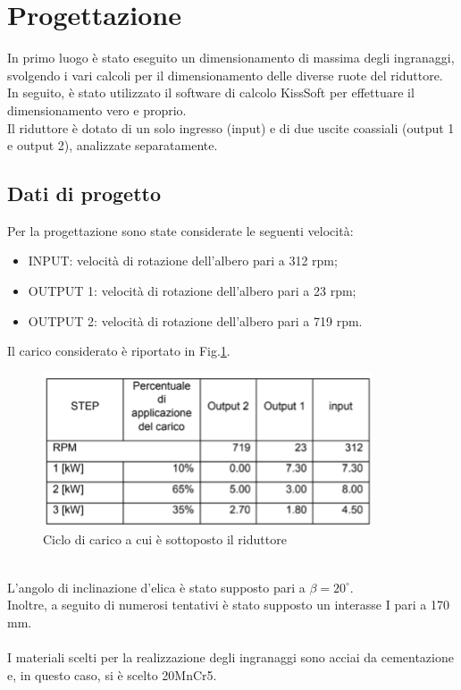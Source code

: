 \section{Progettazione}
In primo luogo è stato eseguito un dimensionamento di massima degli ingranaggi, svolgendo i vari calcoli per il dimensionamento delle diverse ruote del riduttore. In seguito, è stato utilizzato il software di calcolo KissSoft per effettuare il dimensionamento vero e proprio. \\
Il riduttore è dotato di un solo ingresso (input) e di due uscite coassiali (output 1 e output 2), analizzate separatamente. 
\subsection{Dati di progetto}
Per la progettazione sono state considerate le seguenti velocità:
\begin{itemize}
    \item INPUT: velocità di rotazione dell'albero pari a 312 rpm;
    \item OUTPUT 1: velocità di rotazione dell'albero pari a 23 rpm;
    \item OUTPUT 2: velocità di rotazione dell'albero pari a 719 rpm.
\end{itemize}
\newpage
Il carico considerato è riportato in Fig.\ref{fig:Carico}.
\begin{figure}[h]
    \centering
    \includegraphics[scale=0.9]{Immagini/Carico.png}
    \caption{Ciclo di carico a cui è sottoposto il riduttore}
    \label{fig:Carico}
\end{figure}
\\
L’angolo di inclinazione d’elica è stato supposto pari a $\beta=20^\circ$. \\
Inoltre, a seguito di numerosi tentativi è stato supposto un interasse I pari a 170 mm.\\
\\
I materiali scelti per la realizzazione degli ingranaggi sono acciai da cementazione e, in questo caso, si è scelto 20MnCr5.\\
